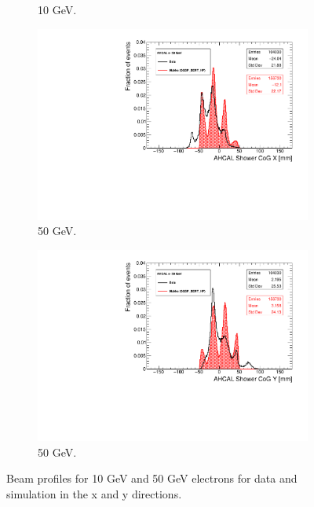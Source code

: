\begin{figure}[htbp!]
\begin{subfigure}[t]{0.49\textwidth}
    \caption{10 GeV.} \label{fig:e10GeVY}
  \end{subfigure}
  \hfill
  \begin{subfigure}[t]{0.49\textwidth}
    \includegraphics[width=1.\linewidth]{../Thesis_Plots/Timing/Electrons/Plots/Run24405_CoGX_AHCAL_50GeV_Comparison.pdf}
    \caption{50 GeV.} \label{fig:e50GeVX}
  \end{subfigure}
  \hfill
  \begin{subfigure}[t]{0.49\textwidth}
    \includegraphics[width=1.\linewidth]{../Thesis_Plots/Timing/Electrons/Plots/Run24405_CoGY_AHCAL_50GeV_Comparison.pdf}
    \caption{50 GeV.} \label{fig:e50GeVY}
  \end{subfigure}
  \caption{Beam profiles for 10 GeV and 50 GeV electrons for data and simulation in the x and y directions.}
  \label{fig:BPe}
\end{figure}

